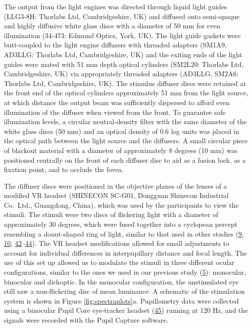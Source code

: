 \documentclass[
]{article}
\begin{document}
The output from the light engines was directed through liquid light guides (LLG3-8H: Thorlabs Ltd, Cambridgeshire, UK) and diffused onto semi-opaque and highly diffusive white glass discs with a diameter of 50 mm for even illumination (34-473: Edmund Optics, York, UK). The light guide gaskets were butt-coupled to the light engine diffusers with threaded adapters (SM1A9, AD3LLG: Thorlabs Ltd, Cambridgeshire, UK) and the exiting ends of the light guides were mated with 51 mm depth optical cylinders (SM2L20: Thorlabs Ltd, Cambridgeshire, UK) via appropriately threaded adapters (AD3LLG, SM2A6: Thorlabs Ltd, Cambridgeshire, UK). The stimulus diffuser discs were retained at the front end of the optical cylinders approximately 51 mm from the light source, at which distance the output beam was sufficiently dispersed to afford even illumination of the diffuser when viewed from the front. To guarantee safe illumination levels, a circular neutral-density filter with the same diameter of the white glass discs (50 mm) and an optical density of 0.6 log units was placed in the optical path between the light source and the diffusers. A small circular piece of blackout material with a diameter of approximately 8 degrees (10 mm) was positioned centrally on the front of each diffuser disc to aid as a fusion lock, as a fixation point, and to occlude the fovea.

The diffuser discs were positioned in the objective planes of the lenses of a modified VR headset (SHINECON SC-G01, Dongguan Shinecon Industrial Co.~Ltd., Guangdong, China), which was used by the participants to view the stimuli. The stimuli were two discs of flickering light with a diameter of approximately 30 degrees, which were fused together into a cyclopean percept resembling a donut-shaped ring of light, similar to that used in other studies (\protect\hyperlink{ref-Murray2018}{9}, \protect\hyperlink{ref-Spitschan2014}{10}, \protect\hyperlink{ref-Barrionuevo2016}{42}--\protect\hyperlink{ref-Zele2018}{44}). The VR headset modifications allowed for small adjustments to account for individual differences in interpupillary distance and focal length. The use of this set up allowed us to modulate the stimuli in three different ocular configurations, similar to the ones we used in our previous study (\protect\hyperlink{ref-Segala2023}{5}): monocular, binocular and dichoptic. In the monocular configuration, the unstimulated eye still saw a non-flickering disc of mean luminance. A schematic of the stimulation system is shown in Figure \ref{fig:spectraplots}a. Pupillometry data were collected using a binocular Pupil Core eye-tracker headset (\protect\hyperlink{ref-Kassner2014}{45}) running at 120 Hz, and the signals were recorded with the Pupil Capture software.
\end{document}
